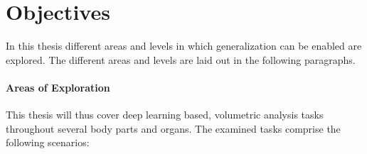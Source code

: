 





    \section{Objectives} %
        In this thesis different areas and levels in which generalization can be enabled are explored. The different areas and levels are laid out in the following paragraphs.

        \paragraph{Areas of Exploration}
            This thesis will thus cover deep learning based, volumetric analysis tasks throughout several body parts and organs. The examined tasks comprise the following scenarios:

